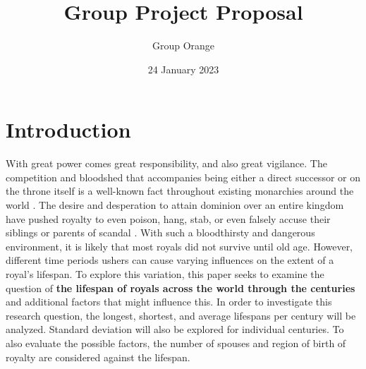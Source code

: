 \documentclass{article}
\title{\vspace{-2.0cm}Group Project Proposal}
\author{Group Orange}
\date{24 January 2023}
\begin{document}
\maketitle

\section{Introduction}
With great power comes great responsibility, and also great vigilance. The competition and bloodshed that accompanies being either a direct successor or on the throne itself is a well-known fact throughout existing monarchies around the world \cite{eisner-2011,kokkonen-2014}.
The desire and desperation to attain dominion over an entire kingdom  have pushed royalty to even poison, hang, stab, or even falsely accuse their siblings or parents of scandal \cite{saint-amand-1993}.
With such a bloodthirsty and dangerous  environment, it is likely that most royals did not survive until old age. 
However, different time periods ushers can cause varying influences on the extent of a royal’s lifespan. 
To explore this variation, this paper seeks to examine the question of \textbf{the lifespan of royals across the world through the centuries} and additional factors that might influence this. 
In order to investigate this research question, the longest, shortest, and average lifespans per century will be analyzed. 
Standard deviation will also be explored for individual centuries. 
To also evaluate the possible factors, the number of spouses and region of birth of royalty are considered against the lifespan. 
\end{document}
